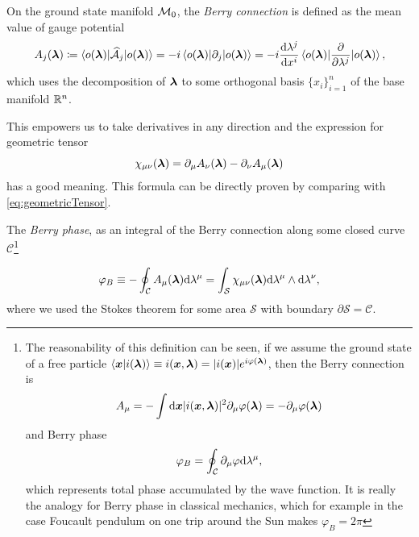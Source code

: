 \begin{definition}    
    On the ground state manifold $\mathcal{M}_0$, the \emph{Berry connection} is defined as the mean value of gauge potential
    \begin{equation}
        A_j({\bm\lambda})\coloneqq \braket{o({\bm\lambda})|\mathcal{\widehat{A}}_j|o({\bm\lambda})}= -i \braket{o({\bm\lambda})|\partial_j|o({\bm\lambda})}= -i\frac{\mathrm{d} \lambda^j}{\mathrm{d} x^i} \braket{o({\bm\lambda})|\frac{\partial }{\partial \lambda^j}|o({\bm\lambda})},
        \label{eq:berryConnection}
    \end{equation}
    which uses the decomposition of ${\bm\lambda}$ to some orthogonal basis $\{x_i\}_{i=1}^n$ of the base manifold $\mathbb{R}^n$. 
\end{definition}
    
This empowers us to take derivatives in any direction and the expression for geometric tensor
\begin{equation}
    \chi_{\mu\nu}({\bm\lambda}) = \partial_\mu A_\nu({\bm\lambda})-\partial_\nu A_\mu({\bm\lambda})
\end{equation}
has a good meaning. This formula can be directly proven by comparing with \ref{eq:geometricTensor}. 


\begin{definition}
    
    The \emph{Berry phase}, as an integral of the Berry connection along some closed curve $\mathcal{C}$\footnote{
        The reasonability of this definition can be seen, if we assume the ground state of a free particle
        $\braket{\bm{x}|i({\bm\lambda})}\equiv i(\bm{x},{\bm\lambda})= |i(\bm{x})|e^{i\varphi({\bm\lambda})}$,
        then the Berry connection is
        \begin{equation}
            A_\mu=-\int \mathrm{d} \bm{x}|i(\bm{x},{\bm\lambda})|^2\partial_\mu \varphi({\bm\lambda}) = -\partial_\mu \varphi({\bm\lambda})
        \end{equation} 
        and Berry phase
        \begin{equation}
            \varphi_B=\oint_\mathcal{C} \partial_\mu \varphi \mathrm{d} \lambda^\mu,
        \end{equation}
        which represents total phase accumulated by the wave function. It is really the analogy for Berry phase in classical mechanics, which for example in the case Foucault pendulum on one trip around the Sun makes $\varphi_B=2\pi$
        }

    \begin{equation}
        \varphi_B\equiv-\oint_\mathcal{C} A_\mu({\bm\lambda})\mathrm{d} \lambda^\mu=\int_\mathcal{S} \chi_{\mu\nu}({\bm\lambda})\mathrm{d} \lambda^\mu \wedge \mathrm{d}\lambda^\nu,
    \end{equation}
    where we used the Stokes theorem for some area $\mathcal{S}$ with boundary $\partial\mathcal{S}=\mathcal{C}$.    
    
\end{definition}

